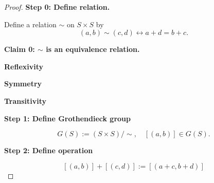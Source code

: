 \documentclass[10pt,a4paper]{book}
\begin{document}
\begin{proof}

    \textbf{Step 0: Define relation.}

    Define a relation $\sim$ on $S \times S$ by
    \[
        (a,b) \sim (c,d) \leftrightarrow a + d = b + c.
    \]

    \textbf{Claim 0: $\sim$ is an equivalence relation.}

    \textbf{Reflexivity}

    \begin{fitchproof}[arrayenv=tabular]

        \open
        \close

    \end{fitchproof}

    \textbf{Symmetry}

    \begin{fitchproof}[arrayenv=tabular]

        \open
        \close

    \end{fitchproof}

    \textbf{Transitivity}
    \begin{fitchproof}[arrayenv=tabular]

        \open

         
         

         

        \close

    \end{fitchproof}

    \textbf{Step 1: Define Grothendieck group}

    \[
        G(S) := (S \times S)/\sim,
        \quad [(a,b)] \in G(S).
    \]


    \textbf{Step 2: Define operation}

    \[
        [(a,b)] + [(c,d)] := [(a+c, b+d)]
    \]


\end{proof}
\end{document}
